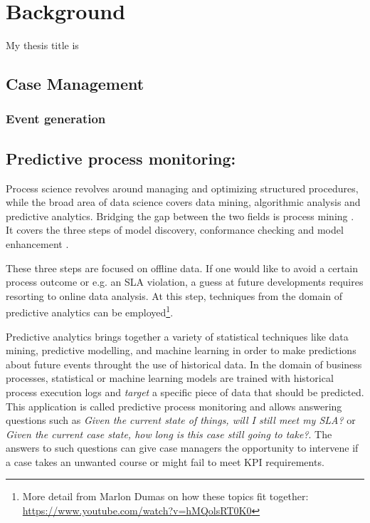 \chapter{Background}\label{chap:background}
My thesis title is \textit{\thesisTitle}

\section{Case Management}
\subsection{Event generation}

\section{Predictive process monitoring:}
Process science revolves around managing and optimizing structured procedures, while the broad area of data science covers data mining, algorithmic analysis and predictive analytics. 
Bridging the gap between the two fields is process mining \cite[p.18]{Aalst16}.
It covers the three steps of model discovery, conformance checking and model enhancement \cite{Aalst16}.

These three steps are focused on offline data.
If one would like to avoid a certain process outcome  or e.g. an SLA violation, a guess at future developments requires resorting to online data analysis.
At this step, techniques from the domain of predictive analytics can be employed\footnote{More detail from Marlon Dumas on how these topics fit together: \url{https://www.youtube.com/watch?v=hMQolsRT0K0}}.

Predictive analytics brings together a variety of statistical techniques like data mining, predictive modelling, and machine learning in order to make predictions about future events throught the use of historical data.
In the domain of business processes, statistical or machine learning models are trained with historical process execution logs and \textit{target} a specific piece of data that should be predicted.
This application is called predictive process monitoring and allows answering questions such as \textit{Given the current state of things, will I still meet my SLA?} or \textit{Given the current case state, how long is this case still going to take?}.
The answers to such questions can give case managers the opportunity to intervene if a case takes an unwanted course or might fail to meet KPI requirements.

